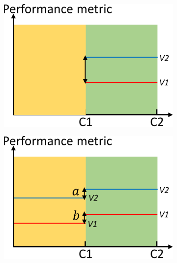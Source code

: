 
\begin{figure}[t]
	\centering
        \begin{subfigure}{0.22\textwidth}
                \includegraphics[width=\linewidth]{Figures/background-a.pdf}
                \caption{}
                \label{fig:description-a}
        \end{subfigure}%
        \begin{subfigure}{0.22\textwidth}
                \includegraphics[width=\linewidth]{Figures/background-b.pdf}

\end{subfigure}
\end{figure}
